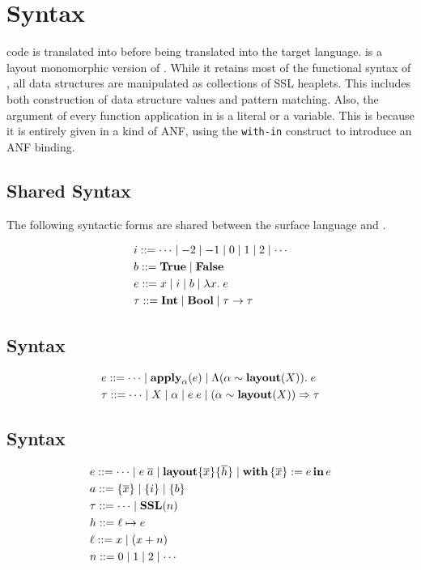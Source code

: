 \section{Syntax}

\Pika{} code is translated into \PikaCore{} before being translated into the target language. \PikaCore{}
is a layout monomorphic version of \Pika{}. While it retains most of the functional syntax of \Pika,
all data structures are manipulated as collections of SSL heaplets. This includes both construction
of data structure values and pattern matching. Also, the argument of every function application in
\PikaCore{} is a literal or a variable. This is because it is entirely given in a kind of ANF, using
the \verb|with-in| construct to introduce an ANF binding.

\subsection{Shared Syntax}

The following syntactic forms are shared between the \Pika{} surface language and \PikaCore.

\begin{align*}
  &i ::= \cdots \mid -2 \mid -1 \mid 0 \mid 1 \mid 2 \mid \cdots
  \\
  &b ::= \textbf{True}{} \mid \textbf{False}
  \\
  &e ::= x \mid i \mid b \mid \lambda x.\; e
  \\
  &\tau ::= \textbf{Int} \mid \textbf{Bool} \mid \tau \rightarrow \tau
\end{align*}

\subsection{\Pika{} Syntax}
\begin{align*}
  &e ::= \cdots \mid \textbf{apply}_{\alpha}(e) \mid \Lambda (\alpha \sim \textbf{layout}(X)).\; e
  \\
  &\tau ::= \cdots \mid X \mid \alpha \mid e\; e \mid (\alpha \sim \textbf{layout}(X)) \Rightarrow \tau
\end{align*}

\subsection{\PikaCore{} Syntax}
\begin{align*}
  &e ::= \cdots \mid e\; \overline{a} \mid \textbf{layout}\{ \overline{x} \}\{ \overline{h} \} \mid \textbf{with}\,\{ \overline{x} \} := e\,\textbf{in}\, e
  \\
  &a ::= \{ \overline{x} \} \mid \{ i \} \mid \{ b \}
  \\
  &\tau ::= \cdots \mid \textbf{SSL}(n)
  \\
  &h ::= \ell \mapsto e
  \\
  &\ell ::= x \mid (x + n)
  \\
  &n ::= 0 \mid 1 \mid 2 \mid \cdots
\end{align*}

